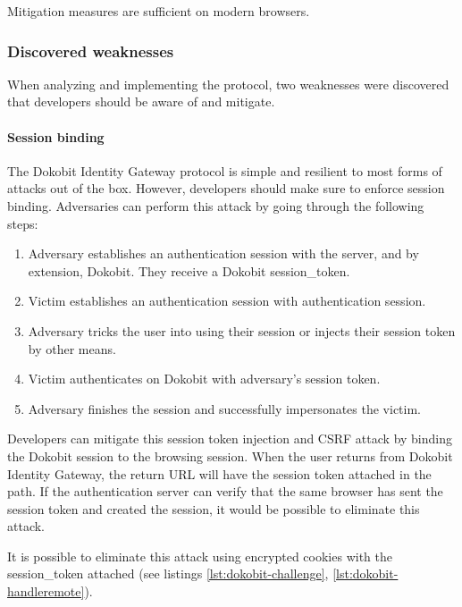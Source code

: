 Mitigation measures are sufficient on modern browsers.

\subsubsection{Discovered weaknesses}

When analyzing and implementing the protocol, two weaknesses were discovered that developers should be aware of and mitigate.

\paragraph{Session binding}


The Dokobit Identity Gateway protocol is simple and resilient to most forms of attacks out of the box. However, developers should make sure to enforce session binding. Adversaries can perform this attack by going through the following steps:

\begin{enumerate}
  \item Adversary establishes an authentication session with the server, and by extension, Dokobit. They receive a Dokobit session\_token.
  \item Victim establishes an authentication session with authentication session.
  \item Adversary tricks the user into using their session or injects their session token by other means.
  \item Victim authenticates on Dokobit with adversary's session token.
  \item Adversary finishes the session and successfully impersonates the victim.
\end{enumerate}

Developers can mitigate this session token injection and CSRF attack by binding the Dokobit session to the browsing session. When the user returns from Dokobit Identity Gateway, the return URL will have the session token attached in the path. If the authentication server can verify that the same browser has sent the session token and created the session, it would be possible to eliminate this attack.

It is possible to eliminate this attack using encrypted cookies with the session\_token attached (see listings \ref{lst:dokobit-challenge}, \ref{lst:dokobit-handleremote}).

